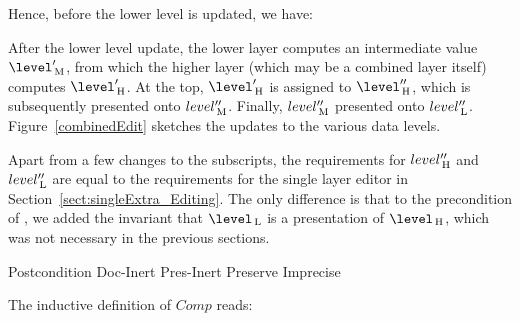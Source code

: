 Hence, before the lower level is updated, we have:


After the lower level update, the lower layer computes an intermediate value $\level'\M$, from which the higher layer (which may be a combined layer itself) computes $\level'\H$. At the top, $\level'\H$ is assigned to $\level''\H$, which is subsequently presented onto $level''_{\, \mathrm M}$. Finally, $level''_{\, \mathrm M}$ presented onto $level''_{\, \mathrm L}$. Figure~\ref{combinedEdit} sketches the updates to the various data levels.


Apart from a few changes to the subscripts, the requirements for $level''_{\, \mathrm H}$ and $level''_{\, \mathrm L}$ are equal to the requirements for the single layer editor in Section~\ref{sect:singleExtra_Editing}. The only difference is that to the precondition of , we added the invariant that $\level\L$ is a presentation of $\level\H$, which was not necessary in the previous sections. 

		{Postcondition}
  {Doc-Inert}
		{Pres-Inert}
	{Preserve}
	{Imprecise}


The inductive definition of $Comp$ reads:


